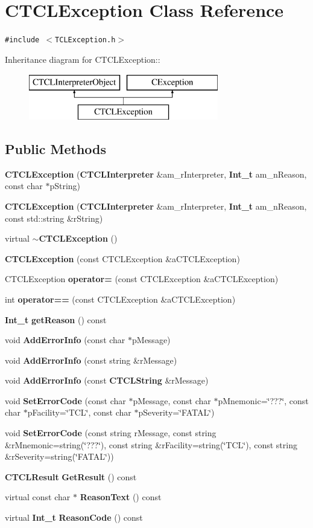\section{CTCLException  Class Reference}
\label{classCTCLException}
{\tt \#include $<$TCLException.h$>$}

Inheritance diagram for CTCLException::\begin{figure}[H]
\begin{center}
\leavevmode
\includegraphics[height=2cm]{classCTCLException}
\end{center}
\end{figure}
\subsection*{Public Methods}
\begin{CompactItemize}
\item 
{\bf CTCLException} ({\bf CTCLInterpreter} \&am\_\-r\-Interpreter, {\bf Int\_\-t} am\_\-n\-Reason, const char $\ast$p\-String)
\item 
{\bf CTCLException} ({\bf CTCLInterpreter} \&am\_\-r\-Interpreter, {\bf Int\_\-t} am\_\-n\-Reason, const std::string \&r\-String)
\item 
virtual {\bf $\sim$CTCLException} ()
\item 
{\bf CTCLException} (const CTCLException \&a\-CTCLException)
\item 
CTCLException {\bf operator=} (const CTCLException \&a\-CTCLException)
\item 
int {\bf operator==} (const CTCLException \&a\-CTCLException)
\item 
{\bf Int\_\-t} {\bf get\-Reason} () const
\item 
void {\bf Add\-Error\-Info} (const char $\ast$p\-Message)
\item 
void {\bf Add\-Error\-Info} (const string \&r\-Message)
\item 
void {\bf Add\-Error\-Info} (const {\bf CTCLString} \&r\-Message)
\item 
void {\bf Set\-Error\-Code} (const char $\ast$p\-Message, const char $\ast$p\-Mnemonic=\char`\"{}???\char`\"{}, const char $\ast$p\-Facility=\char`\"{}TCL\char`\"{}, const char $\ast$p\-Severity=\char`\"{}FATAL\char`\"{})
\item 
void {\bf Set\-Error\-Code} (const string r\-Message, const string \&r\-Mnemonic=string(\char`\"{}???\char`\"{}), const string \&r\-Facility=string(\char`\"{}TCL\char`\"{}), const string \&r\-Severity=string(\char`\"{}FATAL\char`\"{}))
\item 
{\bf CTCLResult} {\bf Get\-Result} () const
\item 
virtual const char $\ast$ {\bf Reason\-Text} () const
\item 
virtual {\bf Int\_\-t} {\bf Reason\-Code} () const
\end{CompactItemize}
